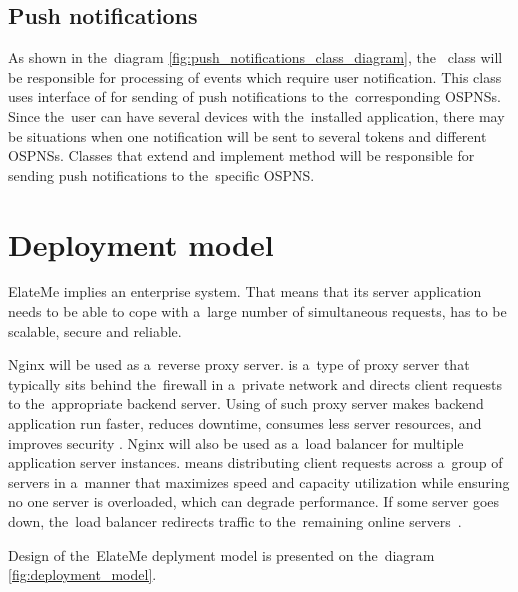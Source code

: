 

\subsection{Push notifications}
As shown in the~diagram \ref{fig:push_notifications_class_diagram}, the~ class will be responsible
for processing of events which require user notification. This class uses interface of
 for sending of push notifications to the~correspon\-ding \ac{OSPNS}s. Since the~user
can have several devices with the~installed application, there may be situations when one notification will be sent to
several tokens and different \ac{OSPNS}s. Classes that extend  and implement method
 will be responsible for sending push notifications to the~specific \ac{OSPNS}.



\section{Deployment model}
ElateMe implies an enterprise system. That means that its server application needs to be able to cope with a~large
number of simultaneous requests, has to be scalable, secure and reliable.

Nginx will be used as a~reverse proxy server.  is a~type of proxy server that typically
sits behind the~firewall in a~private network and directs client requests to the~appropriate backend server. Using of
such proxy server makes backend application run faster, reduces downtime, consumes less server resources, and improves
security \cite{nginxdeploy}. Nginx will also be used as a~load balancer for multiple application server instances.
 means distributing client requests across a~group of servers in a~manner that maximizes
speed and capacity utilization while ensuring no one server is overloaded, which can degrade performance. If some server
goes down, the~load balancer redirects traffic to the~remaining online servers~\cite{reverseproxy}.

Design of the~ElateMe deplyment model is presented on the~diagram \ref{fig:deployment_model}.

